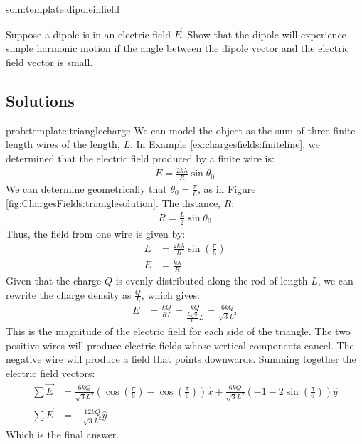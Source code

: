 \begin{problem}{soln:template:dipoleinfield}{\label{prob:template:dipoleinfield}}
	
	
	Suppose a dipole is in an electric field $\vec E$. Show that the dipole will experience simple harmonic motion if the angle between the dipole vector and the electric field vector is small.
	
\end{problem}

\newpage
\subsection{Solutions}
\begin{solution}{prob:template:trianglecharge}\label{soln:template:trianglecharge}
We can model the object as the sum of three finite length wires of the length, $L$. In Example \ref{ex:chargesfields:finiteline}, we determined that the electric field produced by a finite wire is:
\begin{align*}
E = \frac{2k\lambda}{R}\sin\theta_0
\end{align*}
We can determine geometrically that $\theta_0 = \frac{\pi}{6}$, as in Figure \ref{fig:ChargesFields:trianglesolution}. The distance, $R$:
\begin{align*}R = \frac{L}{2}\sin{\theta_0}
\end{align*}
Thus, the field from one wire is given by:
\begin{align*}
E&= \frac{2k\lambda}{R}\sin(\frac{\pi}{6})\\
E &= \frac{k\lambda}{R}
\end{align*}
Given that the charge $Q$ is evenly distributed along the rod of length $L$, we can rewrite the charge density as $\frac{Q}{L}$, which gives:
\begin{align*}
E &= \frac{k Q}{RL} = \frac{k Q}{\frac{L\sqrt{3}}{6}L} = \frac{6k Q}{\sqrt{3}L^2}
\end{align*}
This is the magnitude of the electric field for each side of the triangle. The two positive wires will produce electric fields whose vertical components cancel. The negative wire will produce a field that points downwards. Summing together the electric field vectors:
\begin{align*}
\sum \vec E &= \frac{6k Q}{\sqrt{3}L^2}\left(\cos\left({\frac{\pi}{6}}\right) - \cos\left({\frac{\pi}{6}}\right)\right)\hat{x} + \frac{6k Q}{\sqrt{3}L^2}\left(-1-2\sin\left({\frac{\pi}{6}}\right)\right)\hat y\\
\sum \vec E & = -\frac{12k Q}{\sqrt{3}L^2}\hat y
\end{align*}
Which is the final answer.
\end{solution}



